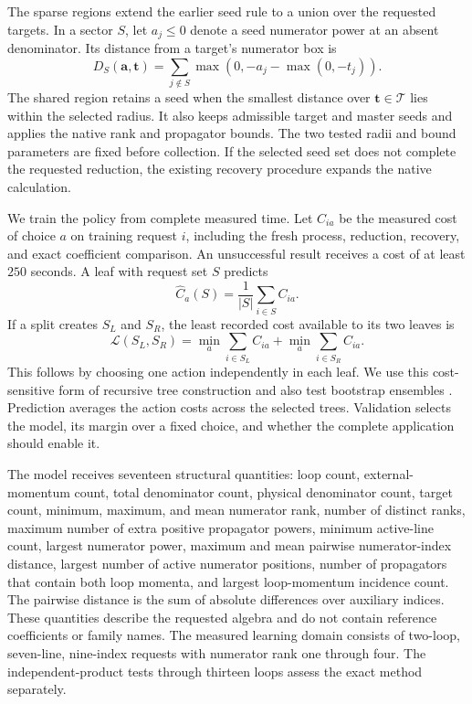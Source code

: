 The sparse regions extend the earlier seed rule to a union over the requested targets. In a sector \(S\), let \(a_j\le0\) denote a seed numerator power at an absent denominator. Its distance from a target's numerator box is
\begin{equation}
 D_S(\mathbf a,\mathbf t)
 =\sum_{j\notin S}\max\!\left(0,-a_j-\max(0,-t_j)\right).
 \label{eq:notes-batch-seed-distance}
\end{equation}
The shared region retains a seed when the smallest distance over \(\mathbf t\in\mathcal T\) lies within the selected radius. It also keeps admissible target and master seeds and applies the native rank and propagator bounds. The two tested radii and bound parameters are fixed before collection. If the selected seed set does not complete the requested reduction, the existing recovery procedure expands the native calculation.

We train the policy from complete measured time. Let \(C_{ia}\) be the measured cost of choice \(a\) on training request \(i\), including the fresh process, reduction, recovery, and exact coefficient comparison. An unsuccessful result receives a cost of at least \(250\) seconds. A leaf with request set \(S\) predicts
\begin{equation}
 \widehat C_a(S)=\frac{1}{|S|}\sum_{i\in S}C_{ia}.
 \label{eq:notes-batch-leaf-cost}
\end{equation}
If a split creates \(S_L\) and \(S_R\), the least recorded cost available to its two leaves is
\begin{equation}
 \mathcal L(S_L,S_R)=
 \min_a\sum_{i\in S_L}C_{ia}
 +\min_a\sum_{i\in S_R}C_{ia}.
 \label{eq:notes-batch-tree-loss}
\end{equation}
This follows by choosing one action independently in each leaf. We use this cost-sensitive form of recursive tree construction and also test bootstrap ensembles \cite{CART1984,Breiman1996Bagging}. Prediction averages the action costs across the selected trees. Validation selects the model, its margin over a fixed choice, and whether the complete application should enable it.

The model receives seventeen structural quantities: loop count, external-momentum count, total denominator count, physical denominator count, target count, minimum, maximum, and mean numerator rank, number of distinct ranks, maximum number of extra positive propagator powers, minimum active-line count, largest numerator power, maximum and mean pairwise numerator-index distance, largest number of active numerator positions, number of propagators that contain both loop momenta, and largest loop-momentum incidence count. The pairwise distance is the sum of absolute differences over auxiliary indices. These quantities describe the requested algebra and do not contain reference coefficients or family names. The measured learning domain consists of two-loop, seven-line, nine-index requests with numerator rank one through four. The independent-product tests through thirteen loops assess the exact method separately.


